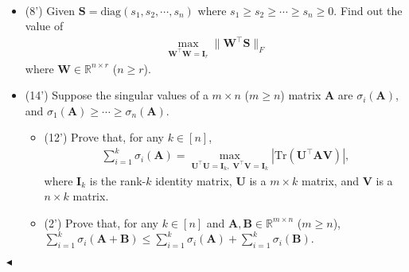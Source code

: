 \documentclass[11pt]{article}
\newenvironment{problem}[2][Problem]{\begin{trivlist}
\item[\hskip \labelsep {\bfseries #1}\hskip \labelsep {\bfseries #2.}]}{\hfill$\blacktriangleleft$\end{trivlist}}
\begin{document}
\begin{problem}{4 (22')}~
\begin{itemize}
    \item [(1)] (8') Given $\bm S=\mathrm{diag}(s_1,s_2,\cdots,s_n)$ where $s_1\geq s_2\geq\cdots\geq s_n\geq 0$. Find out the value of
    \begin{align*}
        \max_{\bm W^\top \bm W =\bm I_r}\|\bm W^\top \bm S\|_F
    \end{align*}
    where $\bm W\in\mathbb{R}^{n\times r}$ ($n\geq r$). 
    \item [(2)] (14') Suppose the singular values of a $m\times n$ ($m\geq n$) matrix $\bm A$ are $\sigma_i(\bm A)$, and $\sigma_1(\bm A)\geq\cdots\geq\sigma_n(\bm A)$.
    \begin{itemize}
        \item [(a)] (12') Prove that, for any $k\in[n]$, 
        \begin{align*}
            \sum_{i=1}^k\sigma_i(\bm A)=\max_{\bm U^\top \bm U=\bm I_k,\;\bm V^\top \bm V=\bm I_k}|\mathrm{Tr}(\bm U^\top \bm A\bm V)|,
        \end{align*}
        where $\bm I_k$ is the rank-$k$ identity matrix, $\bm U$ is a $m\times k$ matrix, and $\bm V$ is a $n\times k$ matrix.
        \item [(b)] (2') Prove that, for any $k\in[n]$ and $\bm A,\bm B\in\mathbb{R}^{m\times n}$ ($m\geq n$), $\sum_{i=1}^k\sigma_i(\bm A+\bm B)\leq\sum_{i=1}^k\sigma_i(\bm A)+\sum_{i=1}^k\sigma_i(\bm B)$.
    \end{itemize}
\end{itemize}
\end{problem}
\end{document}
